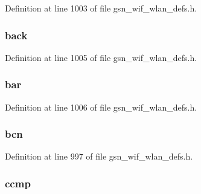 Definition at line 1003 of file gsn\_\-wif\_\-wlan\_\-defs.h.

\hypertarget{a00398_a3702e03ed1260d9f91221ef5d0666475}{
\subsubsection[{back}]{ {\bf back}}}
\label{a00398_a3702e03ed1260d9f91221ef5d0666475}


Definition at line 1005 of file gsn\_\-wif\_\-wlan\_\-defs.h.

\hypertarget{a00398_a03a034213e48dbba2aa02862df5647d9}{
\subsubsection[{bar}]{ {\bf bar}}}
\label{a00398_a03a034213e48dbba2aa02862df5647d9}


Definition at line 1006 of file gsn\_\-wif\_\-wlan\_\-defs.h.

\hypertarget{a00398_a62f65ebffc331cfc72bdfeebfc3c3fe7}{
\subsubsection[{bcn}]{ {\bf bcn}}}
\label{a00398_a62f65ebffc331cfc72bdfeebfc3c3fe7}


Definition at line 997 of file gsn\_\-wif\_\-wlan\_\-defs.h.

\hypertarget{a00398_a1e6e626db840c729cdd71afad98acf4a}{
\subsubsection[{ccmp}]{ {\bf ccmp}}}
\label{a00398_a1e6e626db840c729cdd71afad98acf4a}


